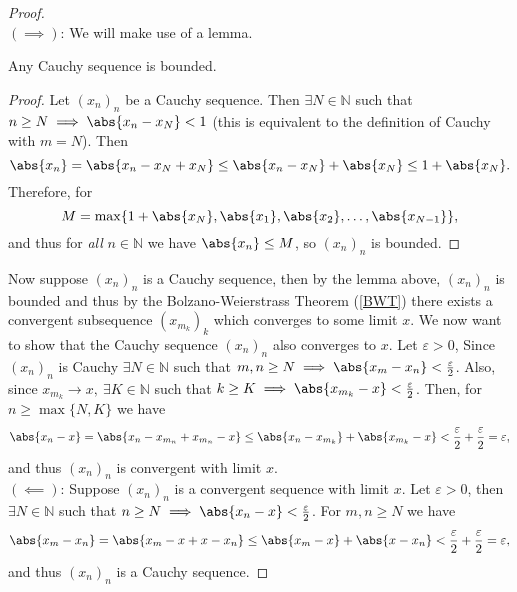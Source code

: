 \documentclass[../real_analysis.tex]{subfiles}
\begin{document}
        \begin{proof}\\
            $(\implies)$: We will make use of a lemma.
            \begin{lemma}
                Any Cauchy sequence is bounded.
            \end{lemma}
            \begin{proof}
                Let $(x_n)_n$ be a Cauchy sequence. Then $\exists N\in\mathbb{N}$ such that $n\geq N\implies\abs{x_n-x_N}<1$ (this is equivalent to the definition of Cauchy with $m=N$). Then
                \begin{equation}
                    \abs{x_n}=\abs{x_n-x_N+x_N}\leq\abs{x_n-x_N}+\abs{x_N}\leq 1+\abs{x_N}.
                \end{equation}
                Therefore, for
                \begin{equation}
                    M=\max\{1+\abs{x_N},\abs{x_1},\abs{x_2},\dots,\abs{x_{N-1}}\},
                \end{equation}
                and thus for \textit{all} $n\in\mathbb{N}$ we have $\abs{x_n}\leq M$, so $(x_n)_n$ is bounded.
            \end{proof}
            Now suppose $(x_n)_n$ is a Cauchy sequence, then by the lemma above, $(x_n)_n$ is bounded and thus by the Bolzano-Weierstrass Theorem (\ref{BWT}) there exists a convergent subsequence $(x_{m_k})_k$ which converges to some limit $x$. We now want to show that the Cauchy sequence $(x_n)_n$ also converges to $x$. Let $\varepsilon>0$, Since $(x_n)_n$ is Cauchy $\exists N\in\mathbb{N}$ such that $m,n\geq N\implies\abs{x_m-x_n}<\frac{\varepsilon}{2}$. Also, since $x_{m_k}\to x,\ \exists K\in\mathbb{N}$ such that $k\geq K\implies\abs{x_{m_k}-x}<\frac{\varepsilon}{2}$. Then, for $n\geq\max\{N,K\}$ we have
            \begin{equation}
                \abs{x_n-x}=\abs{x_n-x_{m_n}+x_{m_n}-x}\leq\abs{x_n-x_{m_k}}+\abs{x_{m_k}-x}<\frac{\varepsilon}{2}+\frac{\varepsilon}{2}=\varepsilon,
            \end{equation}
            and thus $(x_n)_n$ is convergent with limit $x$.\\
            $(\impliedby)$: Suppose $(x_n)_n$ is a convergent sequence with limit $x$. Let $\varepsilon>0$, then $\exists N\in\mathbb{N}$ such that $n\geq N\implies\abs{x_n-x}<\frac{\varepsilon}{2}$. For $m,n\geq N$ we have
            \begin{equation}
                \abs{x_m-x_n}=\abs{x_m-x+x-x_n}\leq\abs{x_m-x}+\abs{x-x_n}<\frac{\varepsilon}{2}+\frac{\varepsilon}{2}=\varepsilon,
            \end{equation}
            and thus $(x_n)_n$ is a Cauchy sequence.
        \end{proof}
\end{document}
